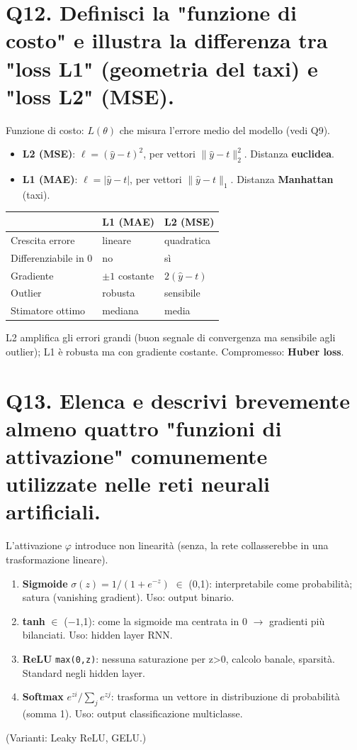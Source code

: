 \documentclass[11pt,a4paper]{article}
\begin{document}
\section*{Q12. Definisci la "funzione di costo" e illustra la differenza tra "loss L1" (geometria del taxi) e "loss L2" (MSE).}
Funzione di costo: $L(\theta )$ che misura l'errore medio del modello (vedi Q9).
\begin{itemize}
\item \textbf{L2 (MSE)}: $\ell  = (\hat{y}-t)^{2}$, per vettori $\|\hat{y}-t\|_{2}^{2}$. Distanza \textbf{euclidea}.
\item \textbf{L1 (MAE)}: $\ell  = |\hat{y}-t|$, per vettori $\|\hat{y}-t\|_{1}$. Distanza \textbf{Manhattan} (taxi).
\end{itemize}
\begin{center}\renewcommand{\arraystretch}{1.25}
\begin{tabular}{|l|l|l|}\hline
\textbf{} & \textbf{L1 (MAE)} & \textbf{L2 (MSE)} \\ \hline
Crescita errore & lineare & quadratica \\ \hline
Differenziabile in 0 & no & sì \\ \hline
Gradiente & $\pm 1$ costante & $2(\hat{y}-t)$ \\ \hline
Outlier & robusta & sensibile \\ \hline
Stimatore ottimo & mediana & media \\ \hline
\end{tabular}\end{center}
L2 amplifica gli errori grandi (buon segnale di convergenza ma sensibile agli outlier); L1 è robusta ma con gradiente costante. Compromesso: \textbf{Huber loss}.
\newpage
\section*{Q13. Elenca e descrivi brevemente almeno quattro "funzioni di attivazione" comunemente utilizzate nelle reti neurali artificiali.}
L'attivazione $\varphi $ introduce non linearità (senza, la rete collasserebbe in una trasformazione lineare).
\begin{enumerate}
\item \textbf{Sigmoide} $\sigma (z)=1/(1+e^{-z})$ $\in $ (0,1): interpretabile come probabilità; satura (vanishing gradient). Uso: output binario.
\item \textbf{tanh} $\in $ ($-1$,1): come la sigmoide ma centrata in 0 $\to $ gradienti più bilanciati. Uso: hidden layer RNN.
\item \textbf{ReLU} \texttt{max(0,z)}: nessuna saturazione per z>0, calcolo banale, sparsità. Standard negli hidden layer.
\item \textbf{Softmax} $e^{zi}/\sum _{j}e^{zj}$: trasforma un vettore in distribuzione di probabilità (somma 1). Uso: output classificazione multiclasse.
\end{enumerate}
(Varianti: Leaky ReLU, GELU.)
\newpage
\end{document}
